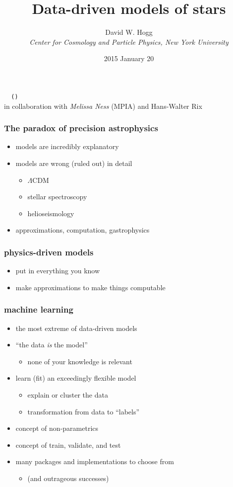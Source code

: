 \documentclass[pdftex]{beamer}
\title{Data-driven models of stars}
\author[David W. Hogg (NYU)]{David W. Hogg \\
  \textsl{\small Center for Cosmology and Particle Physics,
                 New York University}}
\date{2015 January 20}
\begin{document}
\begin{frame}
  \titlepage
  \texttt{\giturl~\githash~(\gitdate)} \\
  in collaboration with \emph{Melissa Ness} (MPIA) and Hans-Walter Rix
\end{frame}

\begin{frame}
  \frametitle{The paradox of precision astrophysics}
  \begin{itemize}
  \item models are incredibly explanatory
  \item models are wrong (ruled out) in detail
    \begin{itemize}
    \item $\Lambda$CDM
    \item stellar spectroscopy
    \item helioseismology
    \end{itemize}
  \item approximations, computation, gastrophysics
  \end{itemize}
\end{frame}

\begin{frame}
  \frametitle{physics-driven models}
  \begin{itemize}
  \item put in everything you know
  \item make approximations to make things computable
  \end{itemize}
\end{frame}

\begin{frame}
  \frametitle{machine learning}
  \begin{itemize}
  \item the most extreme of data-driven models
  \item ``the data \emph{is} the model''
    \begin{itemize}
    \item none of your knowledge is relevant
    \end{itemize}
  \item learn (fit) an exceedingly flexible model
    \begin{itemize}
    \item explain or cluster the data
    \item transformation from data to ``labels''
    \end{itemize}
  \item concept of non-parametrics
  \item concept of train, validate, and test
  \item many packages and implementations to choose from
    \begin{itemize}
    \item (and outrageous successes)
    \end{itemize}
  \end{itemize}
\end{frame}
\end{document}
